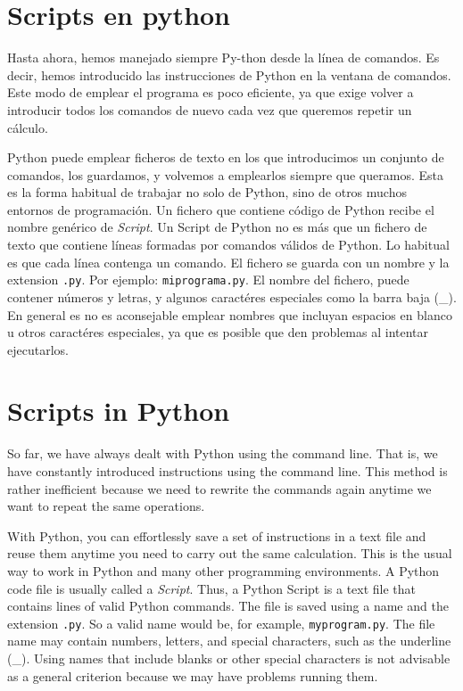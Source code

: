 \begin{paracol}{2}
\section[Scripts en Python]{Scripts en python} 

Hasta ahora, hemos manejado siempre Py-thon desde la línea de comandos. Es decir, hemos introducido las instrucciones de Python en la ventana de comandos. Este modo de emplear el programa es poco eficiente, ya que exige volver a introducir todos los comandos de nuevo cada vez que queremos repetir un cálculo.

Python puede emplear ficheros de texto en los que introducimos un conjunto de comandos, los guardamos, y volvemos a emplearlos siempre que queramos. Esta es la forma habitual de trabajar no solo de Python, sino de otros muchos entornos de programación. Un fichero que contiene código de Python recibe el nombre genérico de \emph{Script}. Un Script de Python  no es más que un fichero de texto que contiene líneas formadas por comandos válidos de Python. Lo habitual es que cada línea contenga un comando. El fichero se guarda con un nombre y la extension \texttt{.py}. Por ejemplo: \texttt{miprograma.py}. El nombre del fichero, puede contener números y letras, y algunos caractéres especiales como la barra baja (\_). En general es no es aconsejable emplear nombres que incluyan espacios en blanco u otros caractéres especiales, ya que es posible que den problemas al intentar ejecutarlos.  

\switchcolumn
\section[Scripts in Python ]{Scripts in Python } 
So far, we have always dealt with Python using the command line. That is, we have constantly introduced instructions using the command line. This method is rather inefficient because we need to rewrite the commands again anytime we want to repeat the same operations.

With Python, you can effortlessly save a set of instructions in a text file and reuse them anytime you need to carry out the same calculation. This is the usual way to work in Python and many other programming environments. A Python code file is usually called a \emph{Script}. Thus, a Python Script is a text file that contains lines of valid Python commands. The file is saved using a name and the extension \texttt{.py}. So a valid name would be, for example, \texttt{myprogram.py}. The file name may contain numbers, letters, and special characters, such as the underline (\_). Using names that include blanks or other special characters is not advisable as a general criterion because we may have problems running them.
\end{paracol}

